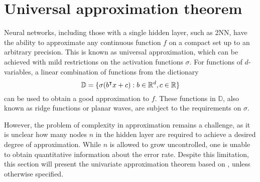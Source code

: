 
\section{Universal approximation theorem}
\label{sec:uat}

Neural networks, including those with a single hidden layer, such as 2NN, have
the ability to approximate any continuous function $f$ on a compact set up to an
arbitrary precision. This is known as universal approximation, which can be
achieved with mild restrictions on the activation functions $\sigma$. For
functions of $d$-variables, a linear combination of functions from the
dictionary
\begin{equation}
    \label{eq:uat_dict}
    \mathbb{D} = \{\sigma(b{}^{\intercal} x + c): b \in \mathbb{R}^d, c\in \mathbb{R} \}
\end{equation}
can be used to obtain a good approximation to $f$. These functions in
$\mathbb{D}$, also known as ridge functions or planar waves, are subject to
the requirements on $\sigma$.

However, the problem of complexity in approximation remains a challenge, as it
is unclear how many nodes $n$ in the hidden layer are required to achieve a
desired degree of approximation. While $n$ is allowed to grow uncontrolled, one
is unable to obtain quantitative information about the error rate. Despite this
limitation, this section will present the univariate approximation theorem based
on \cite{cybenkoApproximationSuperpositionsSigmoidal1989}, unless otherwise
specified.


